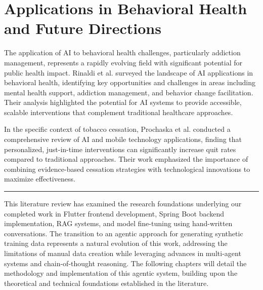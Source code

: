 \section{Applications in Behavioral Health and Future Directions}
The application of AI to behavioral health challenges, particularly addiction management, represents a rapidly evolving field with significant potential for public health impact. Rinaldi et al. \cite{BehavioralHealthAI} surveyed the landscape of AI applications in behavioral health, identifying key opportunities and challenges in areas including mental health support, addiction management, and behavior change facilitation. Their analysis highlighted the potential for AI systems to provide accessible, scalable interventions that complement traditional healthcare approaches.

In the specific context of tobacco cessation, Prochaska et al. \cite{ProchaskaTobacco} conducted a comprehensive review of AI and mobile technology applications, finding that personalized, just-in-time interventions can significantly increase quit rates compared to traditional approaches. Their work emphasized the importance of combining evidence-based cessation strategies with technological innovations to maximize effectiveness.

\begin{center}
\rule{0.7\textwidth}{0.5pt}
\end{center}

This literature review has examined the research foundations underlying our completed work in Flutter frontend development, Spring Boot backend implementation, RAG systems, and model fine-tuning using hand-written conversations. The transition to an agentic approach for generating synthetic training data represents a natural evolution of this work, addressing the limitations of manual data creation while leveraging advances in multi-agent systems and chain-of-thought reasoning. The following chapters will detail the methodology and implementation of this agentic system, building upon the theoretical and technical foundations established in the literature.